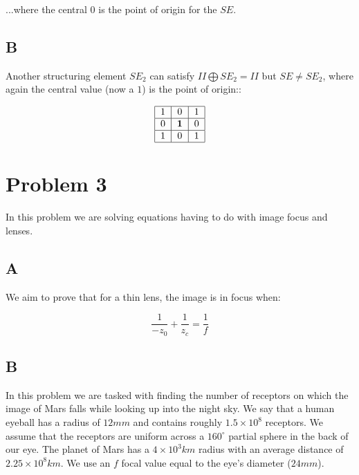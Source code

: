 \documentclass{article}
\begin{document}
\noindent ...where the central $0$ is the point of origin for the $SE$.

\subsection*{B}

Another structuring element $SE_2$ can satisfy $II\bigoplus SE_2 = II$ but $SE\neq SE_2$, where again the central value (now a $1$) is the point of origin::

\begin{equation}
    \begin{tabular}{ | c | c | c | }
        \hline
        1 & 0 & 1 \\
        \hline
        0 & \textbf{1} & 0 \\
        \hline
        1 & 0 & 1 \\
        \hline
    \end{tabular}
\end{equation}


\section*{Problem 3}

In this problem we are solving equations having to do with image focus and lenses.

\subsection*{A}

We aim to prove that for a thin lens, the image is in focus when:

\begin{equation}
    \frac{1}{-z_0} + \frac{1}{z_c} = \frac{1}{f}
\end{equation}



\subsection*{B}

In this problem we are tasked with finding the number of receptors on which the image of Mars falls while looking up into the night sky. We say that a human eyeball has a radius of $12mm$ and contains roughly $1.5\times10^8$ receptors. We assume that the receptors are uniform across a $160^\circ$ partial sphere in the back of our eye. The planet of Mars has a $4\times10^3km$ radius with an average distance of $2.25\times10^8km$. We use an $f$ focal value equal to the eye's diameter ($24mm$).
\end{document}
